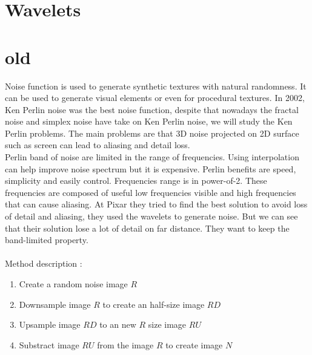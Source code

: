 \documentclass[11pt,a4paper]{article}
\begin{document}
\section{Wavelets}

\section{old}
Noise function is used to generate synthetic textures with natural randomness. It can be used to generate visual elements or even for procedural textures. In 2002, Ken Perlin noise was the best noise function, despite that nowadays the fractal noise and simplex noise have take on Ken Perlin noise, we will study the Ken Perlin problems. The main problems are that 3D noise projected on 2D surface such as screen can lead to aliasing and detail loss.
\\
Perlin band of noise are limited in the range of frequencies. Using interpolation can help improve noise spectrum but it is expensive.
Perlin benefits are speed, simplicity and easily control. Frequencies range is in power-of-2. These frequencies are composed of useful low frequencies visible and high frequencies that can cause aliasing.
At Pixar they tried to find the best solution to avoid loss of detail and aliasing, they used the wavelets to generate noise. But we can see that their solution lose a lot of detail on far distance. They want to keep the band-limited property.
\\\\
Method description :
\begin{enumerate}
\item Create a random noise image $R$
\item Downsample image $R$ to create an half-size image $RD$
\item Upsample image $RD$ to an new $R$ size image $RU$
\item Substract image $RU$ from the image $R$ to create image $N$
\end{enumerate}
\end{document}
